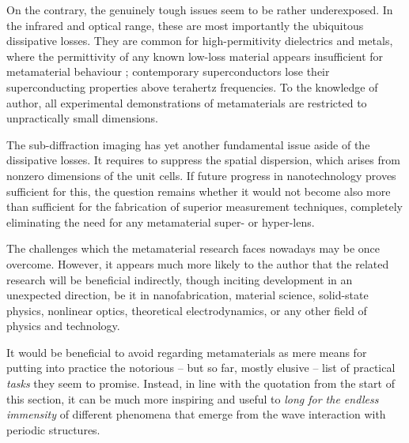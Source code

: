 On the contrary, the genuinely tough issues seem to be rather underexposed. In the infrared and optical range, these are most importantly the ubiquitous dissipative losses. They are common for high-permitivity dielectrics and metals, where the permittivity of any known low-loss material appears insufficient for metamaterial behaviour \cite{dominec2014transition}; contemporary superconductors lose their superconducting properties above terahertz frequencies. To the knowledge of author, all experimental demonstrations of metamaterials are restricted to unpractically small dimensions. 

The sub-diffraction imaging has yet another fundamental issue aside of the dissipative losses. It requires to suppress the spatial dispersion, which arises from nonzero dimensions of the unit cells. If future progress in nanotechnology proves sufficient for this, the question remains whether it would not become also more than sufficient for the fabrication of superior measurement techniques, completely eliminating the need for any metamaterial super- or hyper-lens. 

The challenges which the metamaterial research faces nowadays may be once overcome. However, it appears much more likely to the author that the related research will be beneficial indirectly, though inciting development in an unexpected direction, be it in nanofabrication, material science, solid-state physics, nonlinear optics, theoretical electrodynamics, or any other field of physics and technology.

It would be beneficial to avoid regarding metamaterials as mere means for putting into practice the notorious -- but so far, mostly elusive -- list of practical \textit{tasks} they seem to promise. Instead, in line with the quotation from the start of this section, it can be much more inspiring and useful to \textit{long for the endless immensity} of different phenomena that emerge from the wave interaction with periodic structures.

